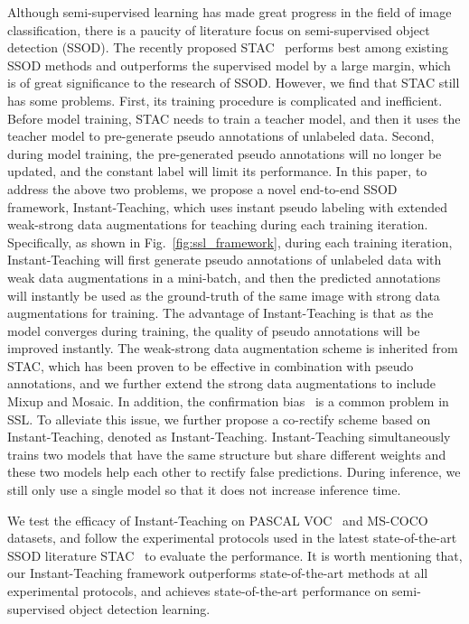 \documentclass[final]{cvpr}
\begin{document}
Although semi-supervised learning has made great progress in the field of image classification, there is a paucity of literature focus on semi-supervised object detection (SSOD). 
The recently proposed STAC~\cite{sohn2020simple} performs best among existing SSOD methods and outperforms the supervised model by a large margin, which is of great significance to the research of SSOD.
However, we find that STAC still has some problems. First, its training procedure is complicated and inefficient. Before model training, STAC needs to train a teacher model, and then it uses the teacher model to pre-generate pseudo annotations of unlabeled data.
Second, during model training, the pre-generated pseudo annotations will no longer be updated, and the constant label will limit its performance.
In this paper, to address the above two problems, we propose a novel end-to-end SSOD framework, Instant-Teaching, which uses instant pseudo labeling with extended weak-strong data augmentations for teaching during each training iteration. Specifically, as shown in Fig.~\ref{fig:ssl_framework}, during each training iteration, Instant-Teaching will first generate pseudo annotations of unlabeled data with weak data augmentations in a mini-batch, and then the predicted annotations will instantly be used as the ground-truth of the same image with strong data augmentations for training. 
The advantage of Instant-Teaching is that as the model converges during training, the quality of pseudo annotations will be improved instantly. 
The weak-strong data augmentation scheme is inherited from STAC, which has been proven to be effective in combination with pseudo annotations, and we further extend the strong data augmentations to include Mixup and Mosaic.
In addition, the confirmation bias~\cite{tarvainen2017mean} is a common problem in SSL. To alleviate this issue, we further propose a co-rectify scheme based on Instant-Teaching, denoted as Instant-Teaching. Instant-Teaching simultaneously trains two models that have the same structure but share different weights and these two models help each other to rectify false predictions. During inference, we still only use a single model so that it does not increase inference time.

We test the efficacy of Instant-Teaching on PASCAL VOC~\cite{everingham2010pascal} and MS-COCO~\cite{lin2014microsoft} datasets, and follow the experimental protocols used in the latest state-of-the-art SSOD literature STAC~\cite{sohn2020simple} to evaluate the performance.
It is worth mentioning that, our Instant-Teaching framework outperforms state-of-the-art methods at all experimental protocols, and achieves state-of-the-art performance on semi-supervised object detection learning.
\end{document}
